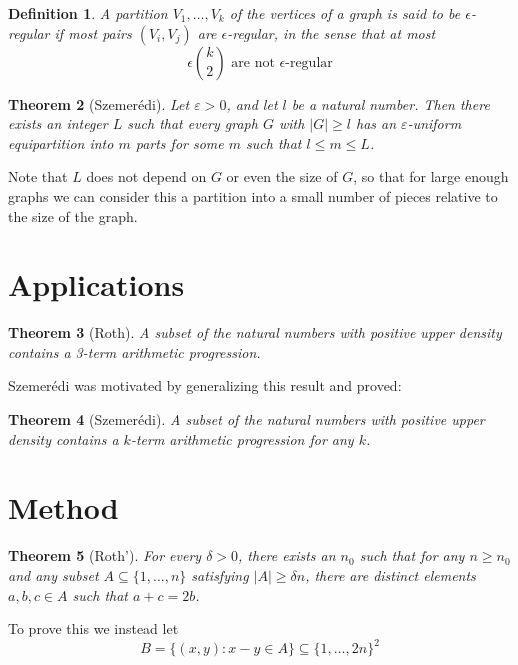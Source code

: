 \documentclass[oneside,12pt,]{article}
\newtheorem{theorem}{Theorem}
\newtheorem{definition}[theorem]{Definition}
\begin{document}
\begin{definition}
    A partition $V_1, \ldots, V_k$ of the vertices of a graph is said to be $\epsilon$-regular if most pairs $(V_i,V_j)$ are $\epsilon$-regular, in the sense that at most
    $$\epsilon \binom k 2\text{ are not }\epsilon\text{-regular}$$
\end{definition}


\begin{theorem}[Szemerédi] Let $\varepsilon>0$, and let $l$ be a natural number. Then there exists an integer $L$ such that every graph $G$ with $|G| \geq l$ has an $\varepsilon$-uniform equipartition into $m$ parts for some $m$ such that $l \leq m \leq L$.
\end{theorem}

Note that $L$ does not depend on $G$ or even the size of $G$, so that for large enough graphs we can consider this a partition into a small number of pieces relative to the size of the graph.


\section{Applications}

\begin{theorem}[Roth]
    A subset of the natural numbers with positive upper density contains a 3-term arithmetic progression.
\end{theorem}


Szemerédi was motivated by generalizing this result and proved:

\begin{theorem}[Szemerédi]
    A subset of the natural numbers with positive upper density contains a 
     $k$-term arithmetic progression for any $k$.
\end{theorem}

\section{Method}

\begin{theorem}[Roth']
    For every $\delta>0$, there exists an $n_0$ such that for any $n \geq n_0$ and any subset $A \subseteq\{1, \ldots, n\}$ satisfying $|A| \geq \delta n$, there are distinct elements $a, b, c \in A$ such that $a+c=2 b$.
\end{theorem}


To prove this we instead let
$$B = \{(x,y) : x - y \in A\} \subseteq \{1, \ldots, 2n\}^2$$
\end{document}
